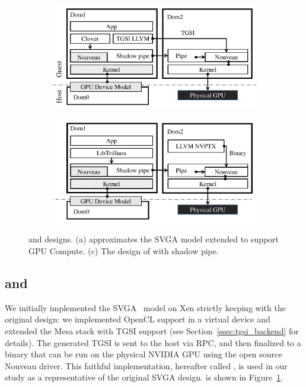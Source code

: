 \begin{figure}[!th]
	\centering
	\begin{subfigure}{.5\linewidth}
		\includegraphics[width=\columnwidth,trim={0 0 0 0},clip]{trillium/images/design/xen-svga.pdf}
		\caption{{}}
		\label{fig_trillium_classic}
	\end{subfigure}\hfill
	\begin{subfigure}{.5\linewidth}
		\includegraphics[width=\columnwidth,trim={0.6cm 0 0 0},clip]{trillium/images/design/trillium.pdf}
		\caption{{}}
		\label{fig_trillium_direct}
	\end{subfigure}
	\caption{{\footnotesize \XenSVGA and \Trillium designs. (a) \XenSVGA approximates the SVGA model extended to support GPU Compute. (c) The design of \Trillium with shadow pipe.}}
\end{figure}

\subsection{\XenSVGA and \Trillium}

We initially implemented the SVGA~\cite{dowty2009gpu} model on Xen strictly
keeping with the original design: we implemented OpenCL support in a virtual
device and extended the Mesa stack with TGSI support (see Section~\ref{ssec:tgsi_backend} for details). The generated TGSI is sent to the host via
RPC, and then finalized to a binary that can be run on the physical NVIDIA GPU
using the open source Nouveau driver. This faithful implementation, hereafter
called \XenSVGA, is used in our study as a representative of the original SVGA
design. \XenSVGA is shown in Figure~\ref{fig_trillium_classic}.


